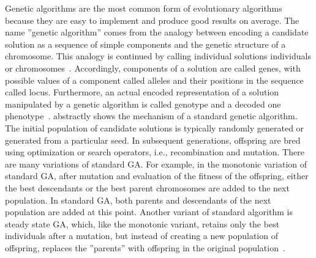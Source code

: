 \documentclass[paper=a4,%
  twoside,%
  BCOR4mm,%
  abstract=true,%
  toc=bibliography,%
  chapterprefix=true,%
  toc=bibliographynumbered,%
  open=right,%
  english,%
  pagesize=pdftex]{scrreprt}
\begin{document}
Genetic algorithms are the most common form of evolutionary algorithms because they are easy to implement and produce good results on average. The name ''genetic algorithm'' comes from the analogy between encoding a candidate solution as a sequence of simple components and the genetic structure of a chromosome. This analogy is continued by calling individual solutions individuals or chromosomes~\cite{Campos2017}. Accordingly, components of a solution are called genes, with possible values of a component called alleles and their positions in the sequence called locus. Furthermore, an actual encoded representation of a solution manipulated by a genetic algorithm is called genotype and a decoded one phenotype~\cite{McMinn_2004}.  abstractly shows the mechanism of a standard genetic algorithm. The initial population of candidate solutions is typically randomly generated or generated from a particular seed. In subsequent generations, offspring are bred using optimization or search operators, i.e., recombination and mutation. There are many variations of standard \ac{GA}. For example, in the monotonic variation of standard \ac{GA}, after mutation and evaluation of the fitness of the offspring, either the best descendants or the best parent chromosomes are added to the next population. In standard \ac{GA}, both parents and descendants of the next population are added at this point. Another variant of standard algorithm is steady state \ac{GA}, which, like the monotonic variant, retains only the best individuals after a mutation, but instead of creating a new population of offspring, replaces the ''parents'' with offspring in the original population~\cite{Campos2017}.
\end{document}
